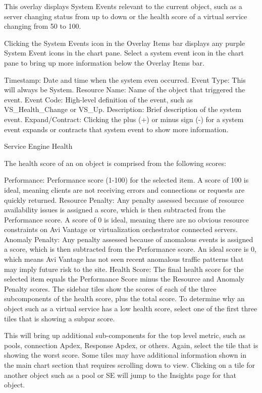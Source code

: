 \documentclass[letterpaper,10pt,english]{sphinxmanual}
\begin{document}
This overlay displays System Events relevant to the current object, such as a server changing status from up to down or the health score of a virtual service changing from 50 to 100.

Clicking the System Events icon in the Overlay Items bar displays any purple System Event icons in the chart pane. Select a system event icon in the chart pane to bring up more information below the Overlay Items bar.

Timestamp: Date and time when the system even occurred.
Event Type: This will always be System.
Resource Name: Name of the object that triggered the event.
Event Code: High-level definition of the event, such as VS\_Health\_Change or VS\_Up.
Description: Brief description of the system event.
Expand/Contract: Clicking the plus (+) or minus sign (-) for a system event expands or contracts that system event to show more information.

Service Engine Health

The health score of an on object is comprised from the following scores:

Performance: Performance score (1-100) for the selected item. A score of 100 is ideal, meaning clients are not receiving errors and connections or requests are quickly returned.
Resource Penalty: Any penalty assessed because of resource availability issues is assigned a score, which is then subtracted from the Performance score. A score of 0 is ideal, meaning there are no obvious resource constraints on Avi Vantage or virtualization orchestrator connected servers.
Anomaly Penalty: Any penalty assessed because of anomalous events is assigned a score, which is then subtracted from the Performance score. An ideal score is 0, which means Avi Vantage has not seen recent anomalous traffic patterns that may imply future risk to the site.
Health Score: The final health score for the selected item equals the Performance Score minus the Resource and Anomaly Penalty scores.
The sidebar tiles show the scores of each of the three subcomponents of the health score, plus the total score. To determine why an object such as a virtual service has a low health score, select one of the first three tiles that is showing a subpar score.

This will bring up additional sub-components for the top level metric, such as pools, connection Apdex, Response Apdex, or others. Again, select the tile that is showing the worst score. Some tiles may have additional information shown in the main chart section that requires scrolling down to view. Clicking on a tile for another object such as a pool or SE will jump to the Insights page for that object.
\end{document}

